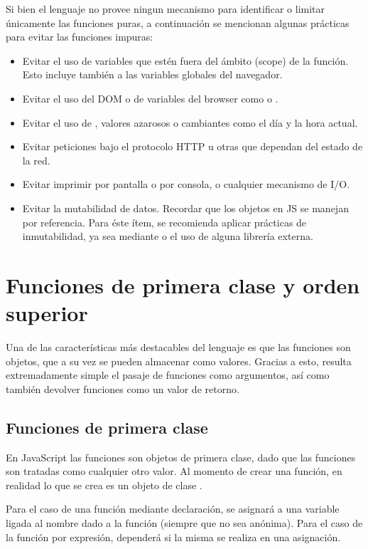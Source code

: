 Si bien el lenguaje no provee ningun mecanismo para identificar o limitar únicamente las funciones puras, a continuación se mencionan algunas prácticas para evitar las funciones impuras:

\begin{itemize}
  \item Evitar el uso de variables que estén fuera del ámbito (scope) de la función. Esto incluye también a las variables globales del navegador.
  \item Evitar el uso del DOM o de variables del browser como  o .
	\item Evitar el uso de , valores azarosos o cambiantes como el día y la hora actual.
	\item Evitar peticiones bajo el protocolo HTTP u otras que dependan del estado de la red.
	\item Evitar imprimir por pantalla o por consola, o cualquier mecanismo de I/O.
	\item Evitar la mutabilidad de datos. Recordar que los objetos en JS se manejan por referencia. Para éste ítem, se recomienda aplicar prácticas de inmutabilidad, ya sea mediante  o el uso de alguna librería externa.
\end{itemize}

\section{Funciones de primera clase y orden superior}

Una de las características más destacables del lenguaje es que las funciones son objetos, que a su vez se pueden almacenar como valores. Gracias a esto, resulta extremadamente simple el pasaje de funciones como argumentos, así como también devolver funciones como un valor de retorno.

\subsection{Funciones de primera clase}

En JavaScript las funciones son objetos de primera clase, dado que las funciones son tratadas como cualquier otro valor. Al momento de crear una función, en realidad lo que se crea es un objeto de clase .

Para el caso de una función mediante declaración, se asignará a una variable ligada al nombre dado a la función (siempre que no sea anónima). Para el caso de la función por expresión, dependerá si la misma se realiza en una asignación.

